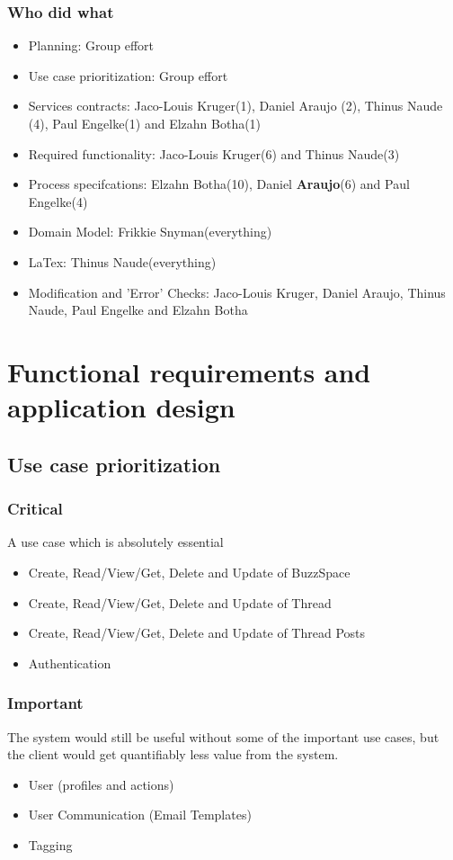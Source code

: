 \documentclass [a4paper,12pt] {article}
\begin{document}
		\subsubsection{Who did what}
			\begin{itemize}
				\item Planning: Group effort
				\item Use case prioritization: Group effort
				\item Services contracts: Jaco-Louis Kruger(1), Daniel Araujo (2), Thinus Naude (4), Paul Engelke(1) and  Elzahn Botha(1)
				\item Required functionality: Jaco-Louis Kruger(6) and Thinus Naude(3)
				\item Process specifcations: Elzahn Botha(10), Daniel \textbf{Araujo}(6) and Paul Engelke(4)
				\item Domain Model: Frikkie Snyman(everything)
				\item LaTex: Thinus Naude(everything)
				\item Modification and 'Error' Checks: Jaco-Louis Kruger, Daniel Araujo, Thinus Naude, Paul Engelke and Elzahn Botha
			\end{itemize}
		\pagebreak
\pagebreak
\section{Functional requirements and application design}
	\subsection{Use case prioritization}
	\subsubsection{Critical}A use case which is absolutely essential
	\begin{itemize}
		\item Create, Read/View/Get, Delete and Update of BuzzSpace
		\item Create, Read/View/Get, Delete and Update of Thread
		\item Create, Read/View/Get, Delete and Update of Thread Posts
		\item Authentication	
	\end{itemize}
	\subsubsection{Important}The system would still be useful without some of the important use cases, but the client would get quantifiably less value from the system.
		\begin{itemize}
			\item User (profiles and actions)
			\item User Communication (Email Templates)
			\item Tagging
		\end{itemize}
\end{document}
